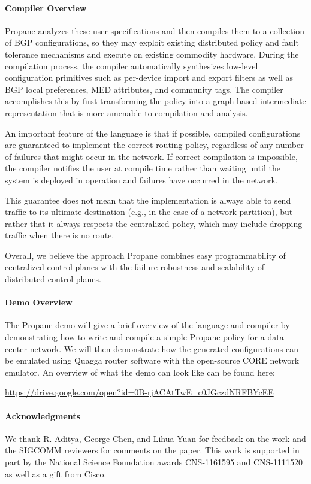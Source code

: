 \documentclass[sigchi]{acmart}
\newcommand{\sysname}{{\small \sf Propane}\xspace}
\newcommand{\para}[1]{\paragraph*{\textbf{#1}}}
\begin{document}
\para{Compiler Overview}

\sysname analyzes these user specifications and
then compiles them to a collection of BGP configurations, so they may
exploit existing distributed policy and fault tolerance mechanisms and
execute on existing commodity hardware. During the compilation
process, the compiler automatically synthesizes low-level configuration 
primitives such as per-device import and export
filters as well as BGP local preferences, MED attributes, and community tags.
The compiler accomplishes this by first transforming the policy into a graph-based intermediate 
representation that is more amenable to compilation and analysis.

An important feature of the language is that if possible, compiled
configurations are guaranteed to implement the correct routing policy,
regardless of any number of failures that might occur in the network.  
If correct compilation is impossible, the compiler notifies the user 
at compile time rather than waiting until the system is deployed in operation
and failures have occurred in the network.

This guarantee does not mean that the implementation is always
able to send traffic to its ultimate destination
(e.g., in the case of a network partition), but rather that it always respects the
centralized policy, which may include dropping traffic when there is no route.

Overall, we believe the approach \sysname combines easy programmability of centralized control planes with the failure robustness and scalability of distributed control planes.


\para{Demo Overview}
The \sysname demo will give a brief overview of the language and compiler by demonstrating how to write and compile a simple \sysname policy for a data center network. We will then demonstrate how the generated configurations can be emulated using Quagga router software with the open-source CORE network emulator.
An overview of what the demo can look like can be found here:

\vspace{1em}
\begin{sloppypar}
\url{https://drive.google.com/open?id=0B-rjACAtTwE_c0JGczdNRFBYcEE}
\end{sloppypar}

\para{Acknowledgments}
We thank R. Aditya, George Chen, and Lihua Yuan for feedback on the work and the SIGCOMM reviewers for comments on the paper. This work is supported in part by the National Science Foundation awards CNS-1161595 and CNS-1111520 as well as a gift from Cisco.





\end{document}
